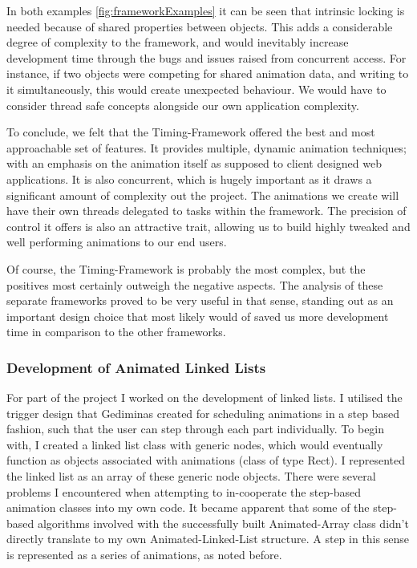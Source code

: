 \documentclass{l3proj}
\begin{document}


In both examples \ref{fig:frameworkExamples} it can be seen that intrinsic locking is needed because of shared properties between objects. This adds a considerable degree of complexity to the framework, and would inevitably increase development time through the bugs and issues raised from concurrent access. For instance, if two objects were competing for shared animation data, and writing to it simultaneously, this would create unexpected behaviour. We would have to consider thread safe concepts alongside our own application complexity.

To conclude, we felt that the Timing-Framework offered the best and most approachable set of features. It provides multiple, dynamic animation techniques; with an emphasis on the animation itself as supposed to client designed web applications. It is also concurrent, which is hugely important as it draws a significant amount of complexity out the project. The animations we create will have their own threads delegated to tasks within the framework. The precision of control it offers is also an attractive trait, allowing us to build highly tweaked and well performing animations to our end users. 

Of course, the Timing-Framework is probably the most complex, but the positives most certainly outweigh the negative aspects. The analysis of these separate frameworks proved to be very useful in that sense, standing out as an important design choice that most likely would of saved us more development time in comparison to the other frameworks.

\subsubsection{Development of Animated Linked Lists}

For part of the project I worked on the development of linked lists. I utilised the trigger design that Gediminas created for scheduling animations in a step based fashion, such that the user can step through each part individually. To begin with, I created a linked list class with generic nodes, which would eventually function as objects associated with animations (class of type Rect). I represented the linked list as an array of these generic node objects. There were several problems I encountered when attempting to in-cooperate the step-based animation classes into my own code. It became apparent that some of the step-based algorithms involved with the successfully built Animated-Array class didn’t directly translate to my own Animated-Linked-List structure. A step in this sense is represented as a series of animations, as noted before.
\end{document}
